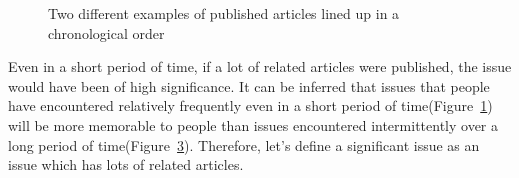 \documentclass[sigconf,authorversion,nonacm]{acmart}
\begin{document}
\begin{figure}[h]
    \centering
    \vspace*{5mm}
    \begin{subfigure}{0.5\linewidth}
        \vspace*{5mm}
        \label{fig:dense}
    \end{subfigure}%
    \begin{subfigure}{0.5\linewidth}
        \vspace*{5mm}
        \label{fig:sparse}
    \end{subfigure}
    \caption{Two different examples of published articles lined up in a chronological order}
\end{figure}

Even in a short period of time, if a lot of related articles were published,
the issue would have been of high significance.
It can be inferred that issues that people have encountered relatively frequently
even in a short period of time(Figure~\ref{fig:dense})
will be more memorable to people
than issues encountered intermittently
over a long period of time(Figure~\ref{fig:sparse}).
Therefore, let's define a significant issue as an issue
which has lots of related articles.
\end{document}
